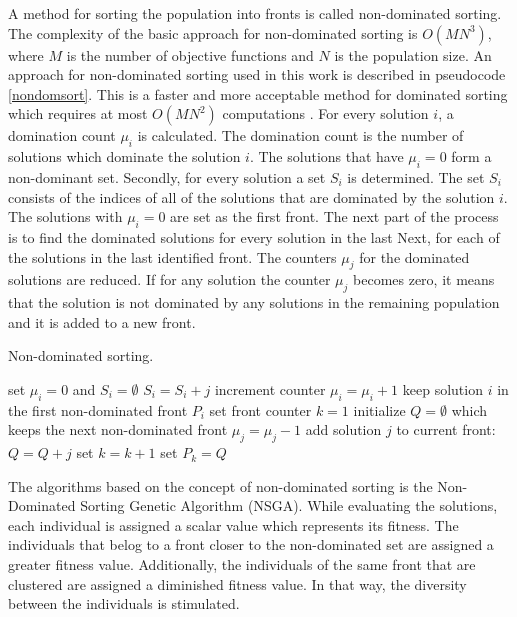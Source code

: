 A method for sorting the population into fronts is called non-dominated sorting. 
The complexity of the basic approach for non-dominated sorting is $O(MN^3)$, where $M$ is the number of objective functions and $N$ is the population size.
An approach for non-dominated sorting used in this work is described in pseudocode 
\ref{nondomsort}. This is a faster and more acceptable method for dominated sorting which requires at most $O(MN^2)$ computations \cite{deb2001multi}.
For every solution $i$, a domination count $\mu_i$ is calculated. The domination count is the number of solutions which dominate the solution $i$. The solutions that have $\mu_i = 0$ form a non-dominant set.
Secondly, for every solution a set $S_i$ is determined. The set $S_i$ consists of the indices of all of the solutions that are dominated by the solution $i$. 
The solutions with $\mu_i=0$ are set as the first front. 
The next part of the process is to find the dominated solutions for every solution in the last 
Next, for each of the solutions in the last identified front. 
The counters $\mu_j$ for the dominated solutions are reduced. 
If for any solution the counter $\mu_j$ becomes zero, it means that the solution is not dominated by any solutions in the remaining population and it is added to a new front. 

\begin{algorithm}
\caption{Non-dominated sorting.\label{nondomsort}}
\begin{algorithmic}
\STATE set $\mu_i = 0$ and $S_i = \emptyset$
\ENDFOR
{}
\STATE $S_i = S_i + j$
\STATE increment counter $\mu_i = \mu_i + 1$
\ENDIF
{} 
\STATE keep solution $i$ in the first non-dominated front $P_i$
\STATE set front counter $k=1$
\ENDIF
\ENDFOR
{}
\STATE initialize $Q = \emptyset$ which keeps the next non-dominated front
\STATE $\mu_j = \mu_j - 1$
\STATE add solution $j$ to current front: $Q = Q + j$
\ENDIF
\ENDFOR
\STATE set $k = k+1$
\STATE set $P_k = Q$
\ENDWHILE
\end{algorithmic}
\end{algorithm}

The algorithms based on the concept of non-dominated sorting is the Non-Dominated Sorting Genetic Algorithm (NSGA). 
While evaluating the solutions, each individual is assigned a scalar value which represents its fitness. 
The individuals that belog to a front closer to the non-dominated set are assigned a greater fitness value. Additionally, the individuals of the same front that are clustered are assigned a diminished fitness value. 
In that way, the diversity between the individuals is stimulated. 


